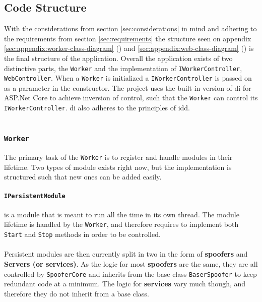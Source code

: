\documentclass{article}
\begin{document}
\subsection{Code Structure}
With the considerations from section \ref{sec:considerations} in mind and adhering to the requirements from section \ref{sec:requirements} the structure seen on appendix \ref{sec:appendix:worker-class-diagram} () and \ref{sec:appendix:web-class-diagram} () is the final structure of the application. Overall the application exists of two distinctive parts, the \texttt{Worker} and the implementation of \texttt{IWorkerController}, \texttt{WebController}. When a \texttt{Worker} is initialized a \texttt{IWorkerController} is passed on as a parameter in the constructor. The project uses the built in version of \gls{di} for ASP.Net Core to achieve inversion of control, such that the \texttt{Worker} can control its \texttt{IWorkerController}. \gls{di} also adheres to the principles of \gls{idd}.
\\\\
\subsubsection{\texttt{Worker}}
The primary task of the \texttt{Worker} is to register and handle modules in their lifetime. Two types of module exists right now, but the implementation is structured such that new ones can be added easily.

\paragraph{\texttt{IPersistentModule}} is a module that is meant to run all the time in its own thread. The module lifetime is handled by the \texttt{Worker}, and therefore requires to implement both \texttt{Start} and \texttt{Stop} methods in order to be controlled.
\\\\
Persistent modules are then currently split in two in the form of \textbf{spoofers} and \textbf{Servers (or services)}. As the logic for most \textbf{spoofers} are the same, they are all controlled by \texttt{SpooferCore} and inherits from the base class \texttt{BaserSpoofer} to keep redundant code at a minimum. The logic for \textbf{services} vary much though, and therefore they do not inherit from a base class.
\end{document}

